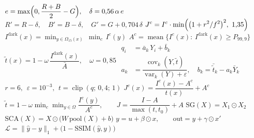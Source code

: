 \documentclass[border=1.5pt,multi=eqn]{standalone}
\newenvironment{eqn}[1]{\fontsize{18}{22}\selectfont\color[HTML]{#1}$\displaystyle}{$}
\begin{document}
\begin{eqn}{0E2238}e=\max\Bigl(0,\dfrac{R+B}{2}-G\Bigr),\quad \delta=0{,}56\,\alpha\,e\end{eqn}
\begin{eqn}{0E2238}R'=R-\delta,\quad B'=B-\delta,\quad G'=G+0{,}704\,\delta\end{eqn}
\begin{eqn}{0E2238}J^{c}=I^{c}\cdot\min\Bigl(\bigl(1+r^{2}/f^{2}\bigr)^{2},\ 1{,}35\Bigr)\end{eqn}
\begin{eqn}{0E2238}I^{\mathrm{dark}}(x)=\min_{y\in\Omega_{15}(x)}\ \min_{c}\,I^{c}(y)\end{eqn}
\begin{eqn}{0E2238}A^{c}=\operatorname{mean}\bigl\{I^{c}(x):\ I^{\mathrm{dark}}(x)\ge P_{99{,}9}\bigr\}\end{eqn}
\begin{eqn}{0E2238}\tilde t(x)=1-\omega\,\dfrac{I^{\mathrm{dark}}(x)}{\bar A},\quad \omega=0{,}85\end{eqn}
\begin{eqn}{0E2238}\begin{aligned}q_i&=\bar a_k\,Y_i+\bar b_k\\ a_k&=\dfrac{\operatorname{cov}_k(Y,\tilde t)}{\operatorname{var}_k(Y)+\varepsilon},\quad b_k=\bar{\tilde t}_k-a_k\bar Y_k\end{aligned}\end{eqn}
\begin{eqn}{0E2238}r=6,\ \ \varepsilon=10^{-3},\ \ t=\operatorname{clip}(q;\,0{,}4;\,1)\end{eqn}
\begin{eqn}{0E2238}J^{c}(x)=\dfrac{I^{c}(x)-A^{c}}{t(x)}+A^{c}\end{eqn}
\begin{eqn}{0E2238}\tilde t=1-\omega\min_{c}\min_{y\in\Omega}\dfrac{I^{c}(y)}{A^{c}},\qquad J=\dfrac{I-A}{\max(t,t_0)}+A\end{eqn}
\begin{eqn}{0E2238}\mathrm{SG}(X)=X_{1}\odot X_{2}\end{eqn}
\begin{eqn}{0E2238}\mathrm{SCA}(X)=X\odot\bigl(W\,\mathrm{pool}(X)+b\bigr)\end{eqn}
\begin{eqn}{0E2238}y=u+\beta\odot x,\qquad \mathrm{out}=y+\gamma\odot x'\end{eqn}
\begin{eqn}{0E2238}\mathcal{L}=\bigl\|\hat y-y\bigr\|_{1}+\bigl(1-\mathrm{SSIM}(\hat y,y)\bigr)\end{eqn}
\end{document}

